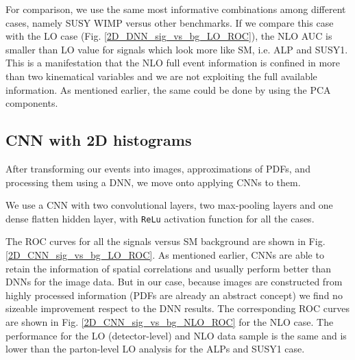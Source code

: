 \documentclass[prd,aps,letterpaper,floatfix,superscriptaddress,preprintnumbers,twocolumn,10pt,nofootinbib]{revtex4-1}
\begin{document}
For comparison, we use the same  most informative combinations among different cases, namely SUSY WIMP versus other benchmarks.   If we compare this case with the LO case (Fig. \ref{2D_DNN_sig_vs_bg_LO_ROC}), the NLO AUC is smaller than LO value for signals which look more like SM, i.e. ALP and SUSY1. This is a manifestation that  the  NLO full event information is confined in more than two kinematical variables and we are not exploiting the full available information. As mentioned earlier, the same could be done by using the PCA components.

\subsection{CNN with 2D histograms}
After transforming our events into images, approximations of PDFs, and processing them using a DNN, we move onto applying CNNs to them.  

We use a CNN with two convolutional layers, two max-pooling layers and one dense 
flatten hidden layer, with {\tt ReLu} activation function for all the cases.

The ROC curves for all the signals versus SM background are shown in Fig. \ref{2D_CNN_sig_vs_bg_LO_ROC}. As mentioned earlier, CNNs are able to retain the information of spatial correlations and usually perform better than DNNs for the image data. But in our case, because images are constructed from highly processed information (PDFs are already an abstract concept) we find no sizeable improvement respect to the DNN results. The corresponding  ROC curves are shown in Fig. \ref{2D_CNN_sig_vs_bg_NLO_ROC} for the NLO case. The performance for the LO (detector-level) and NLO data sample is the same and is lower than the parton-level LO analysis for the ALPs and SUSY1 case. 
\end{document}
